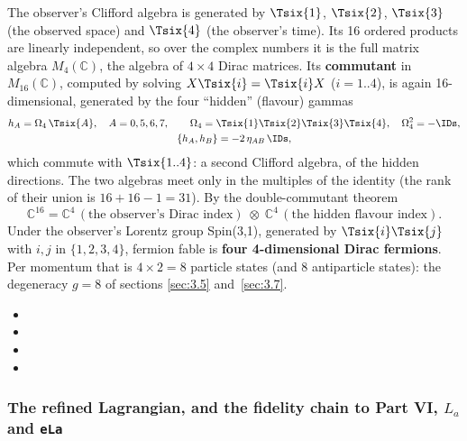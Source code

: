 The observer's Clifford algebra is generated by $\Tsix{1}$, $\Tsix{2}$, $\Tsix{3}$ (the observed
space) and $\Tsix{4}$ (the observer's time). Its 16 ordered products are linearly independent, so
over the complex numbers it is the full matrix algebra $M_4(\mathbb C)$, the algebra of $4\times4$
Dirac matrices. Its \textbf{commutant} in $M_{16}(\mathbb C)$, computed by solving
$X\Tsix{i}=\Tsix{i}X$ ($i=1..4$), is again 16-dimensional, generated by the four ``hidden''
(flavour) gammas
\begin{gather*}
  h_A=\Omega_4\,\Tsix{A},\quad A=0,5,6,7,\qquad
  \Omega_4=\Tsix{1}\Tsix{2}\Tsix{3}\Tsix{4},\quad \Omega_4^2=-\IDs,\\
  \{h_A,h_B\}=-2\,\eta_{AB}\,\IDs ,
\end{gather*}
which commute with $\Tsix{1..4}$: a second Clifford algebra, of the hidden directions. The two
algebras meet only in the multiples of the identity (the rank of their union is $16+16-1=31$). By
the double-commutant theorem
\[
  \mathbb C^{16}=\mathbb C^{4}\,(\text{the observer's Dirac index})\;\otimes\;\mathbb C^{4}\,(\text{the hidden flavour index}) .
\]
Under the observer's Lorentz group Spin(3,1), generated by $\Tsix{i}\Tsix{j}$ with $i,j$ in
$\{1,2,3,4\}$, fermion fable is \textbf{four 4-dimensional Dirac fermions}. Per momentum that is
$4\times2=8$ particle states (and 8 antiparticle states): the degeneracy $g=8$ of sections
\ref{sec:3.5} and~\ref{sec:3.7}. 
\begin{itemize}
  \item {}
  \item {}
  \item {}
  \item {}
\end{itemize}

\subsubsection{The refined Lagrangian, and the fidelity chain to Part VI, \texorpdfstring{$L_a$}{La} and \texttt{eLa}}
\label{sec:3.2.7}

